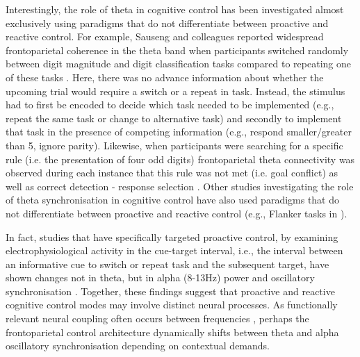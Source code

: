\documentclass[preprint,authoryear,11pt,5p,times,twocolumns]{elsarticle}
\begin{document}
Interestingly, the role of theta in cognitive control has been investigated almost exclusively using paradigms that do not differentiate between proactive and reactive control. For example, Sauseng and colleagues reported widespread frontoparietal coherence in the theta band when participants switched randomly between digit magnitude and digit classification tasks compared to repeating one of these tasks \citep{SausengTSWT}. Here, there was no advance information about whether the upcoming trial would require a switch or a repeat in task. Instead, the stimulus had to first be encoded to decide which task needed to be implemented (e.g., repeat the same task or change to alternative task) and secondly to implement that task in the presence of competing information (e.g., respond smaller/greater than 5, ignore parity). Likewise, when participants were searching for a specific rule (i.e. the presentation of four odd digits) frontoparietal theta connectivity was observed during each instance that this rule was not met (i.e. goal conflict) as well as correct detection - response selection \citep{Moore2006}. Other studies investigating the role of theta synchronisation in cognitive control have also used paradigms that do not differentiate between proactive and reactive control (e.g., Flanker tasks in \citealt{Cavanagh}). 


In fact, studies that have specifically targeted proactive control, by examining electrophysiological activity in the cue-target interval, i.e., the interval between an informative cue to switch or repeat task and the subsequent target, have shown changes not in theta, but in alpha (8-13Hz) power \citep{Mansfield2012} and oscillatory synchronisation \citep{Serrien}. Together, these findings suggest that proactive and reactive cognitive control modes may involve distinct neural processes. As functionally relevant neural coupling often occurs between frequencies \citep{Jensen}, perhaps the frontoparietal control architecture dynamically shifts between theta and alpha oscillatory synchronisation depending on contextual demands.
\end{document}
